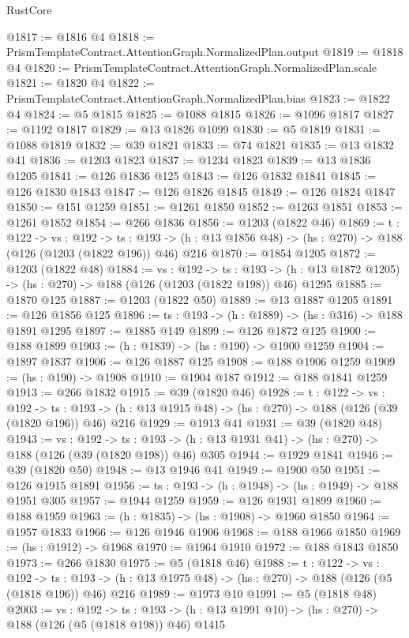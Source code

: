 \begin{lexlean}{RustCore}
\begin{coremodule}
@1817 := @1816 @4
@1818 := PrismTemplateContract.AttentionGraph.NormalizedPlan.output
@1819 := @1818 @4
@1820 := PrismTemplateContract.AttentionGraph.NormalizedPlan.scale
@1821 := @1820 @4
@1822 := PrismTemplateContract.AttentionGraph.NormalizedPlan.bias
@1823 := @1822 @4
@1824 := @5 @1815
@1825 := @1088 @1815
@1826 := @1096 @1817
@1827 := @1192 @1817
@1829 := @13 @1826 @1099
@1830 := @5 @1819
@1831 := @1088 @1819
@1832 := @39 @1821
@1833 := @74 @1821
@1835 := @13 @1832 @41
@1836 := @1203 @1823
@1837 := @1234 @1823
@1839 := @13 @1836 @1205
@1841 := @126 @1836 @125
@1843 := @126 @1832 @1841
@1845 := @126 @1830 @1843
@1847 := @126 @1826 @1845
@1849 := @126 @1824 @1847
@1850 := @151 @1259
@1851 := @1261 @1850
@1852 := @1263 @1851
@1853 := @1261 @1852
@1854 := @266 @1836
@1856 := @1203 (@1822 @46)
@1869 := {t : @122} ->
  {vs : @192} ->
  {ts : @193} -> (h : @13 @1856 @48) -> (hs : @270) -> @188 (@126 (@1203 (@1822 @196)) @46) @216
@1870 := @1854 @1205
@1872 := @1203 (@1822 @48)
@1884 := {vs : @192} ->
  {ts : @193} -> (h : @13 @1872 @1205) -> (hs : @270) -> @188 (@126 (@1203 (@1822 @198)) @46) @1295
@1885 := @1870 @125
@1887 := @1203 (@1822 @50)
@1889 := @13 @1887 @1205
@1891 := @126 @1856 @125
@1896 := {ts : @193} -> (h : @1889) -> (hs : @316) -> @188 @1891 @1295
@1897 := @1885 @149
@1899 := @126 @1872 @125
@1900 := @188 @1899
@1903 := (h : @1839) -> (hs : @190) -> @1900 @1259
@1904 := @1897 @1837
@1906 := @126 @1887 @125
@1908 := @188 @1906 @1259
@1909 := (hs : @190) -> @1908
@1910 := @1904 @187
@1912 := @188 @1841 @1259
@1913 := @266 @1832
@1915 := @39 (@1820 @46)
@1928 := {t : @122} ->
  {vs : @192} ->
  {ts : @193} -> (h : @13 @1915 @48) -> (hs : @270) -> @188 (@126 (@39 (@1820 @196)) @46) @216
@1929 := @1913 @41
@1931 := @39 (@1820 @48)
@1943 := {vs : @192} ->
  {ts : @193} -> (h : @13 @1931 @41) -> (hs : @270) -> @188 (@126 (@39 (@1820 @198)) @46) @305
@1944 := @1929 @1841
@1946 := @39 (@1820 @50)
@1948 := @13 @1946 @41
@1949 := @1900 @50
@1951 := @126 @1915 @1891
@1956 := {ts : @193} -> (h : @1948) -> (hs : @1949) -> @188 @1951 @305
@1957 := @1944 @1259
@1959 := @126 @1931 @1899
@1960 := @188 @1959
@1963 := (h : @1835) -> (hs : @1908) -> @1960 @1850
@1964 := @1957 @1833
@1966 := @126 @1946 @1906
@1968 := @188 @1966 @1850
@1969 := (hs : @1912) -> @1968
@1970 := @1964 @1910
@1972 := @188 @1843 @1850
@1973 := @266 @1830
@1975 := @5 (@1818 @46)
@1988 := {t : @122} ->
  {vs : @192} ->
  {ts : @193} -> (h : @13 @1975 @48) -> (hs : @270) -> @188 (@126 (@5 (@1818 @196)) @46) @216
@1989 := @1973 @10
@1991 := @5 (@1818 @48)
@2003 := {vs : @192} ->
  {ts : @193} -> (h : @13 @1991 @10) -> (hs : @270) -> @188 (@126 (@5 (@1818 @198)) @46) @1415

\end{coremodule}
\end{lexlean}
